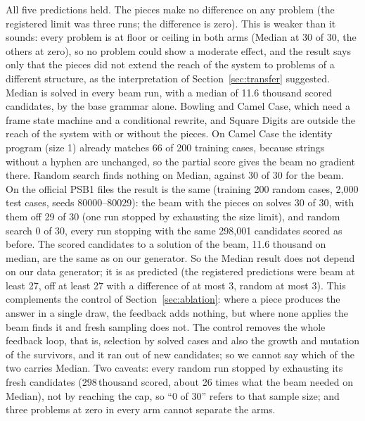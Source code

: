 \documentclass[sigconf,nonacm]{acmart}
\begin{document}
All five predictions held. The pieces make no difference on any problem (the registered limit was three runs; the difference is zero). This is weaker than it sounds: every problem is at floor or ceiling in both arms (Median at 30 of 30, the others at zero), so no problem could show a moderate effect, and the result says only that the pieces did not extend the reach of the system to problems of a different structure, as the interpretation of Section~\ref{sec:transfer} suggested. Median is solved in every beam run, with a median of 11.6 thousand scored candidates, by the base grammar alone. Bowling and Camel Case, which need a frame state machine and a conditional rewrite, and Square Digits are outside the reach of the system with or without the pieces. On Camel Case the identity program (size 1) already matches 66 of 200 training cases, because strings without a hyphen are unchanged, so the partial score gives the beam no gradient there. Random search finds nothing on Median, against 30 of 30 for the beam. On the official PSB1 files the result is the same (training 200 random cases, 2,000 test cases, seeds 80000--80029): the beam with the pieces on solves 30 of 30, with them off 29 of 30 (one run stopped by exhausting the size limit), and random search 0 of 30, every run stopping with the same 298,001 candidates scored as before. The scored candidates to a solution of the beam, 11.6 thousand on median, are the same as on our generator. So the Median result does not depend on our data generator; it is as predicted (the registered predictions were beam at least 27, off at least 27 with a difference of at most 3, random at most 3). This complements the control of Section~\ref{sec:ablation}: where a piece produces the answer in a single draw, the feedback adds nothing, but where none applies the beam finds it and fresh sampling does not. The control removes the whole feedback loop, that is, selection by solved cases and also the growth and mutation of the survivors, and it ran out of new candidates; so we cannot say which of the two carries Median. Two caveats: every random run stopped by exhausting its fresh candidates (298\,thousand scored, about 26 times what the beam needed on Median), not by reaching the cap, so ``0 of 30'' refers to that sample size; and three problems at zero in every arm cannot separate the arms.
\end{document}
